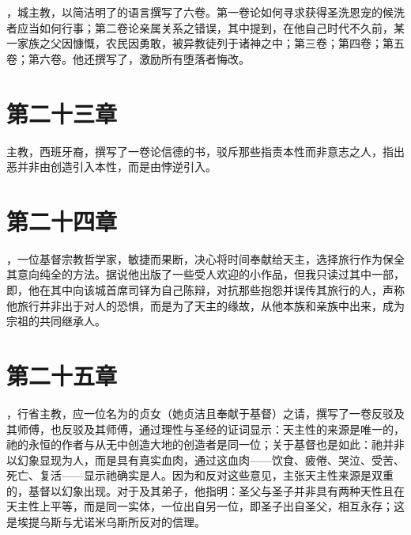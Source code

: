 ，城主教，以简洁明了的语言撰写了六卷。第一卷论如何寻求获得圣洗恩宠的候洗者应当如何行事；第二卷论亲属关系之错误，其中提到，在他自己时代不久前，某一家族之父因慷慨，农民因勇敢，被异教徒列于诸神之中；第三卷；第四卷；第五卷；第六卷。他还撰写了，激励所有堕落者悔改。\par


\section{第二十三章}

主教，西班牙裔，撰写了一卷论信德的书，驳斥那些指责本性而非意志之人，指出恶并非由创造引入本性，而是由悖逆引入。\par


\section{第二十四章}

，一位基督宗教哲学家，敏捷而果断，决心将时间奉献给天主，选择旅行作为保全其意向纯全的方法。据说他出版了一些受人欢迎的小作品，但我只读过其中一部，即，他在其中向该城首席司铎为自己陈辩，对抗那些抱怨并误传其旅行的人，声称他旅行并非出于对人的恐惧，而是为了天主的缘故，从他本族和亲族中出来，成为宗祖的共同继承人。\par


\section{第二十五章}

，行省主教，应一位名为的贞女（她贞洁且奉献于基督）之请，撰写了一卷反驳及其师傅，也反驳及其师傅，通过理性与圣经的证词显示：天主性的来源是唯一的，祂的永恒的作者与从无中创造大地的创造者是同一位；关于基督也是如此：祂并非以幻象显现为人，而是具有真实血肉，通过这血肉——饮食、疲倦、哭泣、受苦、死亡、复活——显示祂确实是人。因为和反对这些意见，主张天主性来源是双重的，基督以幻象出现。对于及其弟子，他指明：圣父与圣子并非具有两种天性且在天主性上平等，而是同一实体，一位出自另一位，即圣子出自圣父，相互永存；这是埃提乌斯与尤诺米乌斯所反对的信理。\par


